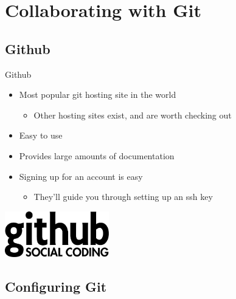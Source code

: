 \documentclass[aspectratio=43]{beamer}
\begin{document}
\section{Collaborating with Git}

\subsection{Github}

\begin{frame}{Github}
    \begin{itemize}
    \item Most popular git hosting site in the world
        \begin{itemize}
        \item Other hosting sites exist, and are worth checking out
        \end{itemize}
    \item Easy to use
    \item Provides large amounts of documentation
    \item Signing up for an account is easy
        \begin{itemize}
        \item They'll guide you through setting up an ssh key
        \end{itemize}
    \end{itemize}
    \begin{center}
        \includegraphics[height=2cm]{resources/github_logo.pdf}
    \end{center}
\end{frame}

\subsection{Configuring Git}
\end{document}
